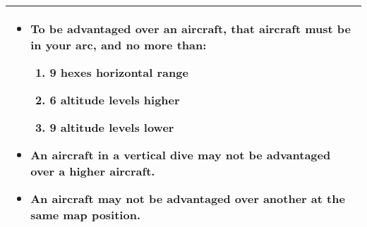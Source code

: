 \begin{onecolumntablefloat}
\begin{onecolumntable}


\begin{tabularx}{\linewidth}{L}
\toprule
\begin{itemize}
\item
To be advantaged over an aircraft, that aircraft must be in your  arc, and no more than:
\begin{enumerate}[align=left, labelwidth=0.7em, label=\alph*.]
\item 9 hexes horizontal range
\item 6 altitude levels higher
\item 9 altitude levels lower
\end{enumerate}
\item 
An aircraft in a vertical dive may not be advantaged over a higher aircraft.
\item 
An aircraft may not be advantaged over another at the same map position.
\end{itemize}\\[-1ex]
\bottomrule
\end{tabularx}

\end{onecolumntable}
\end{onecolumntablefloat}


